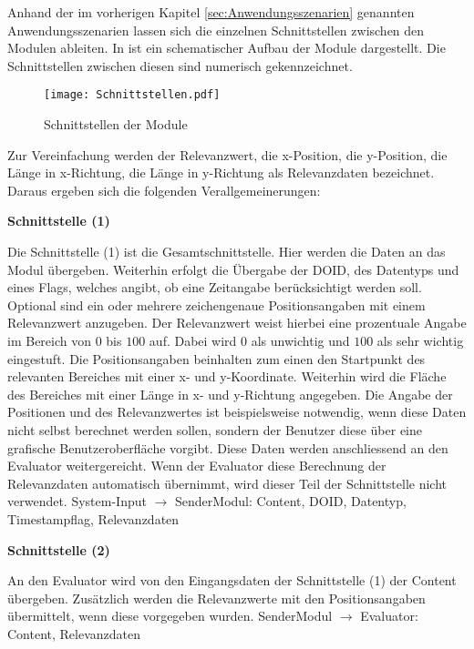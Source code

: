 Anhand der im vorherigen Kapitel \ref{sec:Anwendungsszenarien} genannten
Anwendungsszenarien lassen sich die einzelnen Schnittstellen zwischen den
Modulen ableiten. In  ist ein schematischer Aufbau
der Module dargestellt. Die Schnittstellen zwischen diesen sind numerisch
gekennzeichnet.

\begin{figure}[H]
	\centering
	\texttt{[image: Schnittstellen.pdf]}
	\caption{Schnittstellen der Module}
	\label{fig:Schnittstellen}
\end{figure}

Zur Vereinfachung werden der Relevanzwert, die x-Position, die
y-Position, die Länge in x-Richtung, die Länge in y-Richtung als Relevanzdaten
bezeichnet. Daraus ergeben sich die folgenden Verallgemeinerungen:

\textbf{Schnittstelle (1)}

Die Schnittstelle (1) ist die Gesamtschnittstelle. Hier werden die
Daten an das Modul übergeben. Weiterhin erfolgt die Übergabe der \gls{DOID}, des
Datentyps und eines Flags, welches angibt, ob eine Zeitangabe berücksichtigt
werden soll.
Optional sind ein oder mehrere zeichengenaue Positionsangaben mit einem
Relevanzwert anzugeben. Der Relevanzwert weist hierbei eine prozentuale Angabe
im Bereich von $0$ bis $100$ auf. Dabei wird $0$ als unwichtig und $100$ als
sehr wichtig eingestuft. Die Positionsangaben beinhalten zum einen den
Startpunkt des relevanten Bereiches mit einer x- und y-Koordinate. Weiterhin
wird die Fläche des Bereiches mit einer Länge in x- und y-Richtung angegeben.
Die Angabe der Positionen und des Relevanzwertes ist beispielsweise notwendig,
wenn diese Daten nicht selbst berechnet werden sollen, sondern der Benutzer
diese über eine grafische Benutzeroberfläche vorgibt. Diese Daten werden
anschliessend an den Evaluator weitergereicht. Wenn der Evaluator diese
Berechnung der Relevanzdaten automatisch übernimmt, wird dieser Teil der
Schnittstelle nicht verwendet.
\newline 
System-Input $\rightarrow$ SenderModul: Content, \gls{DOID}, Datentyp,
Timestampflag, Relevanzdaten

\textbf{Schnittstelle (2)}

An den Evaluator wird von den Eingangsdaten der Schnittstelle (1)
der Content übergeben. Zusätzlich werden die Relevanzwerte mit den
Positionsangaben übermittelt, wenn diese vorgegeben wurden.\newline
SenderModul $\rightarrow$ Evaluator: Content, Relevanzdaten  

